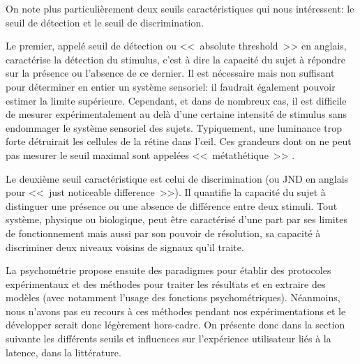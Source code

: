 	\par On note plus particulièrement deux seuils caractéristiques qui nous intéressent: le seuil de détection et le seuil de discrimination. 
	
	\par Le premier, appelé seuil de détection ou <<~absolute threshold~>> en anglais, caractérise la détection du stimulus, c'est à dire la capacité du sujet à répondre sur la présence ou l'absence de ce dernier. Il est nécessaire mais non suffisant pour déterminer en entier un système sensoriel: il faudrait également pouvoir estimer la limite supérieure. Cependant, et dans de nombreux cas, il est difficile de mesurer expérimentalement au delà d'une certaine intensité de stimulus sans endommager le système sensoriel des sujets. Typiquement, une luminance trop forte détruirait les cellules de la rétine dans l'œil. Ces grandeurs dont on ne peut pas mesurer le seuil maximal sont appelées <<~métathétique~>> \citep{stevens_psychophysical_1957}.
	
	\par Le deuxième seuil caractéristique est celui de discrimination (ou JND en anglais pour <<~just noticeable difference~>>). Il quantifie la capacité du sujet à distinguer une présence ou une absence de différence entre deux stimuli. Tout système, physique ou biologique, peut être caractérisé d'une part par ses limites de fonctionnement mais aussi par son pouvoir de résolution, sa capacité à discriminer deux niveaux voisins de signaux qu'il traite.
	
	\par La psychométrie propose ensuite des paradigmes pour établir des protocoles expérimentaux et des méthodes pour traiter les résultats et en extraire des modèles (avec notamment l'usage des fonctions psychométriques). Néanmoins, nous n'avons pas eu recours à ces méthodes pendant nos expérimentations et le développer serait donc légèrement hors-cadre. On présente donc dans la section suivante les différents seuils et influences sur l'expérience utilisateur liés à la latence, dans la littérature.	
	
